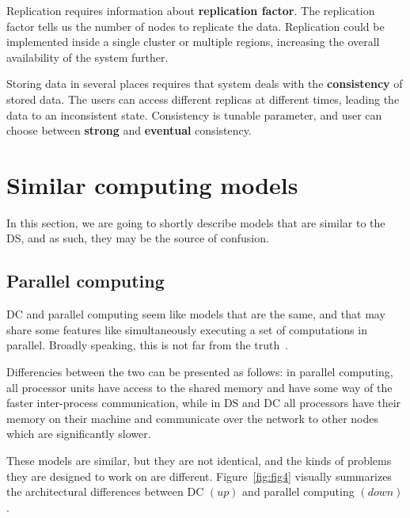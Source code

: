 Replication requires information about \textbf{replication factor}. The replication factor tells us the number of nodes to replicate the data. Replication could be implemented inside a single cluster or multiple regions, increasing the overall availability of the system further.

Storing data in several places requires that system deals with the \textbf{consistency} of stored data. The users can access different replicas at different times, leading the data to an inconsistent state. Consistency is tunable parameter, and user can choose between \textbf{strong} and \textbf{eventual} consistency.
%
%
\section{Similar computing models}\label{sec:similar_models}
%
In this section, we are going to shortly describe models that are similar to the DS, and as such, they may be the source of confusion.
%
%
\subsection{Parallel computing}\label{sec:parallel_computing}
%
DC and parallel computing seem like models that are the same, and that may share some features like simultaneously executing a set of computations in parallel. Broadly speaking, this is not far from the truth~\cite{Vera16}. 

Differencies between the two can be presented as follows: in parallel computing, all processor units have access to the shared memory and have some way of the faster inter-process communication, while in DS and DC all processors have their memory on their machine and communicate over the network to other nodes which are significantly slower. 

These models are similar, but they are not identical, and the kinds of problems they are designed to work on are different. Figure~\ref{fig:fig4} visually summarizes the architectural  differences between DC $(up)$ and parallel computing $(down)$.

